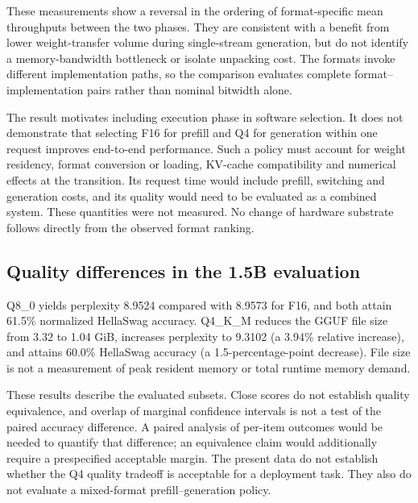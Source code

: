 \documentclass[11pt]{article}
\begin{document}
These measurements show a reversal in the ordering of format-specific mean
throughputs between the two phases. They are consistent with a benefit from lower
weight-transfer volume during single-stream generation, but do not identify a
memory-bandwidth bottleneck or isolate unpacking cost. The formats invoke different
implementation paths, so the comparison evaluates complete format--implementation
pairs rather than nominal bitwidth alone.

The result motivates including execution phase in software selection. It does not
demonstrate that selecting F16 for prefill and Q4 for generation within one request
improves end-to-end performance. Such a policy must account for weight residency,
format conversion or loading, KV-cache compatibility and numerical effects at the
transition. Its request time would include prefill, switching and generation costs,
and its quality would need to be evaluated as a combined system. These quantities
were not measured. No change of hardware substrate follows directly from the
observed format ranking.

\subsection{Quality differences in the 1.5B evaluation}
\begin{table}[t]
\centering\small
\caption{Official GGUF file size and measured quality pilots. HellaSwag uses 200
fixed-seed tasks. Scores are descriptive; no equivalence or paired significance
test is reported.}
\label{tab:stage2-quality}
\end{table}

Q8\_0 yields perplexity 8.9524 compared with 8.9573 for F16, and both attain
61.5\% normalized HellaSwag accuracy. Q4\_K\_M reduces the GGUF file size from
3.32 to 1.04 GiB, increases perplexity to 9.3102 (a 3.94\% relative increase), and
attains 60.0\% HellaSwag accuracy (a 1.5-percentage-point decrease). File size is
not a measurement of peak resident memory or total runtime memory demand.

These results describe the evaluated subsets. Close scores do not establish
quality equivalence, and overlap of marginal confidence intervals is not a test
of the paired accuracy difference. A paired analysis of per-item outcomes would
be needed to quantify that difference; an equivalence claim would additionally
require a prespecified acceptable margin. The present data do not establish
whether the Q4 quality tradeoff is acceptable for a deployment task. They also do
not evaluate a mixed-format prefill--generation policy.
\end{document}

